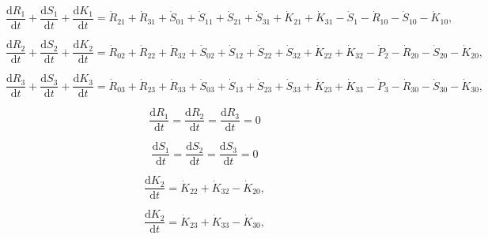  \begin{equation} \label{eq:C-CV_R_dot_1}
 	\frac{\mathrm{d}R_{1}}{\mathrm{d}t} 
	+ \frac{\mathrm{d}S_{1}}{\mathrm{d}t}
 	+ \frac{\mathrm{d}K_{1}}{\mathrm{d}t}
 	=  \dot{R}_{21} + \dot{R}_{31}
 	+ \dot{S}_{01} + \dot{S}_{11} 
	+ \dot{S}_{21} + \dot{S}_{31}
 	+ \dot{K}_{21} + \dot{K}_{31}
 	- \dot{S}_{1} 
	- \dot{R}_{10} 
 	- \dot{S}_{10} 
 	- \dot{K}_{10},
 \end{equation}
 
 \begin{equation} \label{eq:C-CV_R_dot_2}
 	\frac{\mathrm{d}R_{2}}{\mathrm{d}t} 
	+ \frac{\mathrm{d}S_{2}}{\mathrm{d}t}
 	+ \frac{\mathrm{d}K_{2}}{\mathrm{d}t}
 	=  \dot{R}_{02} + \dot{R}_{22} + \dot{R}_{32}
 	+ \dot{S}_{02} + \dot{S}_{12} 
	+ \dot{S}_{22} + \dot{S}_{32} 
 	+ \dot{K}_{22} + \dot{K}_{32}
 	- \dot{P}_{2}
 	- \dot{R}_{20} 
 	- \dot{S}_{20} 
 	- \dot{K}_{20},
 \end{equation}
 
 \begin{equation} \label{eq:C-CV_R_dot_3}
 	\frac{\mathrm{d}R_{3}}{\mathrm{d}t} 
	+ \frac{\mathrm{d}S_{3}}{\mathrm{d}t}
 	+ \frac{\mathrm{d}K_{3}}{\mathrm{d}t}
 	=  \dot{R}_{03} + \dot{R}_{23} + \dot{R}_{33}
 	+ \dot{S}_{03} + \dot{S}_{13} 
	+ \dot{S}_{23} + \dot{S}_{33} 
 	+ \dot{K}_{23} + \dot{K}_{33}
 	- \dot{P}_{3}
 	- \dot{R}_{30} 
 	- \dot{S}_{30} 
 	- \dot{K}_{30},
 \end{equation}

\begin{equation}\label{eq:C-dR_dt_zero}
	\frac{\mathrm{d}R_{1}}{\mathrm{d}t} = \frac{\mathrm{d}R_{2}}{\mathrm{d}t} = \frac{\mathrm{d}R_{3}}{\mathrm{d}t} = 0
\end{equation}

\begin{equation}\label{eq:C-dS_dt_zero}
	\frac{\mathrm{d}S_{1}}{\mathrm{d}t} = \frac{\mathrm{d}S_{2}}{\mathrm{d}t} = \frac{\mathrm{d}S_{3}}{\mathrm{d}t} = 0
\end{equation}

\begin{equation} \label{eq:C-CV_K_dot_2}
	\frac{\mathrm{d}K_{2}}{\mathrm{d}t}
	=  \dot{K}_{22} + \dot{K}_{32} 
	- \dot{K}_{20},
\end{equation}

\begin{equation} \label{eq:C-CV_K_dot_3}
	\frac{\mathrm{d}K_{2}}{\mathrm{d}t}
	=  \dot{K}_{23} + \dot{K}_{33} 
	- \dot{K}_{30},
\end{equation}

